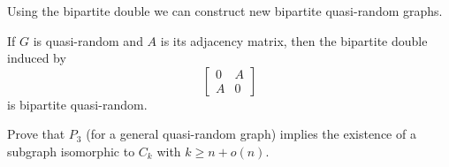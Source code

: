 Using the bipartite double we can construct new bipartite quasi-random graphs.
\begin{proposition}
	If \(G\) is quasi-random and \(A\) is its adjacency matrix, then the bipartite double induced by \[ \begin{bmatrix}		0 & A\\
		A & 0
	\end{bmatrix}
	\] is bipartite quasi-random.
\end{proposition}
\begin{problem}
	Prove that \(P_3\) (for a general quasi-random graph) implies the existence of a subgraph isomorphic to \(C_{k}\) with \(k \ge n + o\left( n \right) \).
\end{problem}
